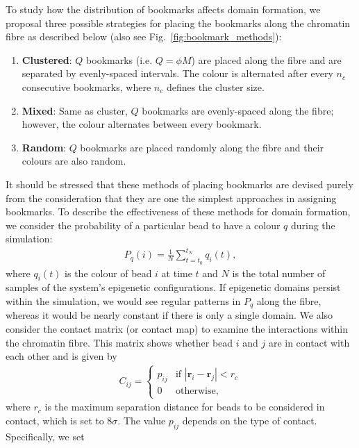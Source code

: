 \documentclass[12pt]{article}
\newcommand{\abs}[1]{\left|#1\right|}
\begin{document}
To study how the distribution of bookmarks affects domain formation, we proposal three possible strategies for placing the bookmarks along the chromatin fibre as described below (also see Fig.~\ref{fig:bookmark_methods}):
\begin{enumerate}
\item \textbf{Clustered}: $Q$ bookmarks (i.e. $Q = \phi M$) are placed along the fibre and are separated by evenly-spaced intervals. The colour is alternated after every $n_c$ consecutive bookmarks, where $n_c$ defines the cluster size. 
\item \textbf{Mixed}: Same as cluster, $Q$ bookmarks are evenly-spaced along the fibre; however, the colour alternates between every bookmark. 
\item \textbf{Random}: $Q$ bookmarks are placed randomly along the fibre and their colours are also random.
\end{enumerate}
It should be stressed that these methods of placing bookmarks are devised purely from the consideration that they are one the simplest approaches in assigning bookmarks. To describe the effectiveness of these methods for domain formation, we consider the probability of a particular bead to have a colour $q$ during the simulation:
\begin{eqnarray}
\label{eqn:probability}
P_{q}(i) = \frac{1}{N} \sum_{t=t_0}^{t_N} q_i(t),
\end{eqnarray}
where $q_i(t)$ is the colour of bead $i$ at time $t$ and $N$ is the total number of samples of the system's epigenetic configurations. If epigenetic domains persist within the simulation, we would see regular patterns in $P_q$ along the fibre, whereas it would be nearly constant if there is only a single domain. We also consider the contact matrix (or contact map) to examine the interactions within the chromatin fibre. This matrix shows whether bead $i$ and $j$ are in contact with each other and is given by
\begin{eqnarray}
C_{ij} = \left\{ 
	\begin{array}{ll}
		p_{ij} & \textrm{if $\abs{\bm{r}_i - \bm{r}_j} < r_c$}\\
		0 & \textrm{otherwise},
	\end{array}\right.
\end{eqnarray}
where $r_c$ is the maximum separation distance for beads to be considered in contact, which is set to $8\sigma$. The value $p_{ij}$ depends on the type of contact. Specifically, we set
\end{document}
